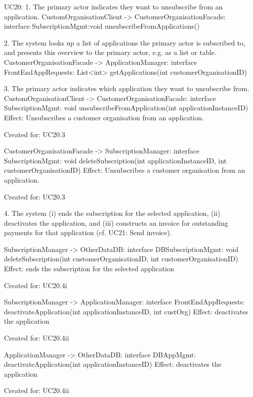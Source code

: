 {{{{{{{{    UC20:
        1. The primary actor indicates they want to unsubscribe from an application.
            CustomOrganisationClient -> CustomerOrganisationFacade: interface SubscriptionMgmt:void  unsubscribeFromApplications()


        2. The system looks up a list of applications the primary actor is subscribed to, and presents this
            overview to the primary actor, e.g. as a list or table.
            CustomerOrganisationFacade -> ApplicationManager: interface FrontEndAppRequests: List<int> getApplications(int customerOrganisationID)

        3. The primary actor indicates which application they want to unsubscribe from.
             CustomOrganisationClient -> CustomerOrganisationFacade: interface SubscriptionMgmt: void  unsubscribeFromApplication(int applicationInstanceID)
                 Effect: Unsubscribes a customer organisation from an application.
                 \item Created for: UC20.3

             CustomerOrganisationFacade -> SubscriptionManager: interface SubscriptionMgmt: void  deleteSubscription(int applicationInstanceID, int customerOrganisationID)
                 Effect: Unsubscribes a customer organisation from an application.
                 \item Created for: UC20.3

        4. The system (i) ends the subscription for the selected application,
           (ii) deactivates the application, and
           (iii) constructs an invoice for outstanding payments for that application (cf. UC21: Send invoice).

            SubscriptionManager -> OtherDataDB: interface DBSubscriptionMgmt: void deleteSubscription(int customerOrganisationID, int customerOrganisationID)
                Effect: ends the subscription for the selected application
                \item Created for: UC20.4i

            SubscriptionManager -> ApplicationManager: interface FrontEndAppRequests: deactivateApplication(int applicationInstanceID, int custOrg)
                Effect: deactivates the application
                \item Created for: UC20.4ii

            ApplicationManager -> OtherDataDB: interface DBAppMgmt: deactivateApplication(int applicationInstanceID)
                Effect: deactivates the application
                \item Created for: UC20.4ii

}}}}}}}}
